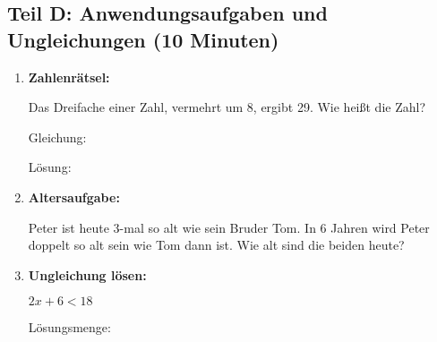 \subsection*{Teil D: Anwendungsaufgaben und Ungleichungen (10 Minuten)}

\begin{enumerate}[label=\arabic*.,resume]

    \item \textbf{Zahlenrätsel:}

    Das Dreifache einer Zahl, vermehrt um 8, ergibt 29. Wie heißt die Zahl?

    Gleichung: \underline{\hspace{6cm}}

    Lösung: \underline{\hspace{6cm}}

    \vspace{2cm}

    \item \textbf{Altersaufgabe:}

    Peter ist heute 3-mal so alt wie sein Bruder Tom. In 6 Jahren wird Peter doppelt so alt sein wie Tom dann ist. Wie alt sind die beiden heute?

    \vspace{3cm}

    \item \textbf{Ungleichung lösen:}

    $2x + 6 < 18$

    Lösungsmenge: \underline{\hspace{6cm}}

\end{enumerate}
